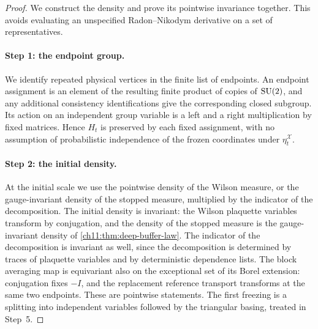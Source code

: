 \begin{proof}
We construct the density and prove its pointwise invariance together. This avoids evaluating an unspecified Radon--Nikodym derivative on a set of representatives.

\paragraph{Step 1: the endpoint group.}
We identify repeated physical vertices in the finite list of endpoints. An endpoint assignment is an element of the resulting finite product of copies of $\mathrm{SU}(2)$, and any additional consistency identifications give the corresponding closed subgroup. Its action on an independent group variable is a left and a right multiplication by fixed matrices. Hence $H_t$ is preserved by each fixed assignment, with no assumption of probabilistic independence of the frozen coordinates under $\eta_t^{\mathcal X}$.

\paragraph{Step 2: the initial density.}
At the initial scale we use the pointwise density of the Wilson measure, or the gauge-invariant density of the stopped measure, multiplied by the indicator of the decomposition. The initial density is invariant: the Wilson plaquette variables transform by conjugation, and the density of the stopped measure is the gauge-invariant density of \cref{ch11:thm:deep-buffer-law}. The indicator of the decomposition is invariant as well, since the decomposition is determined by traces of plaquette variables and by deterministic dependence lists. The block averaging map is equivariant also on the exceptional set of its Borel extension: conjugation fixes $-I$, and the replacement reference transport transforms at the same two endpoints. These are pointwise statements. The first freezing is a splitting into independent variables followed by the triangular basing, treated in Step~5.


\end{proof}
